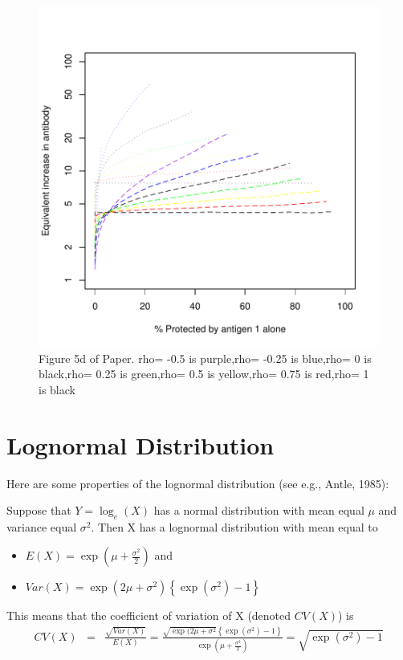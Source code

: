 \documentclass{article}[12pt]
\begin{document}
\begin{figure}
\caption{Figure 5d of Paper.
rho= -0.5  is  purple,rho= -0.25  is  blue,rho= 0  is  black,rho= 0.25  is  green,rho= 0.5  is  yellow,rho= 0.75  is  red,rho= 1  is  black
 \label{fig:5d} }
\includegraphics{hbimdetails-fig5d}
\end{figure}


\section{Lognormal Distribution}
\label{app:logn}

Here are some properties of the lognormal distribution (see e.g., Antle, 1985):

Suppose that $Y=\log_e(X)$ has a normal distribution with mean equal 
$\mu$ and variance equal $\sigma^2$. Then X has a lognormal 
distribution with mean equal to
\begin{itemize}
\item $E(X) = \exp \left(\mu + \frac{\sigma^2}{2} \right)$      and
\item $Var(X) = \exp \left(2 \mu + \sigma^2 \right) \left\{ 
\exp(\sigma^2)-1 \right\}$
\end{itemize}

This means that the coefficient of variation of X (denoted $CV(X)$) 
is
\begin{eqnarray*}
CV(X) & =& \frac{ \sqrt{Var(X)}}{E(X)} = \frac{ 
\sqrt{\exp(2\mu+\sigma^2} \left\{\exp(\sigma^2)-1 \right\} 
}{\exp\left( \mu + \frac{\sigma^2}{2} \right) } = 
\sqrt{\exp(\sigma^2)-1}
\end{eqnarray*}
\end{document}
